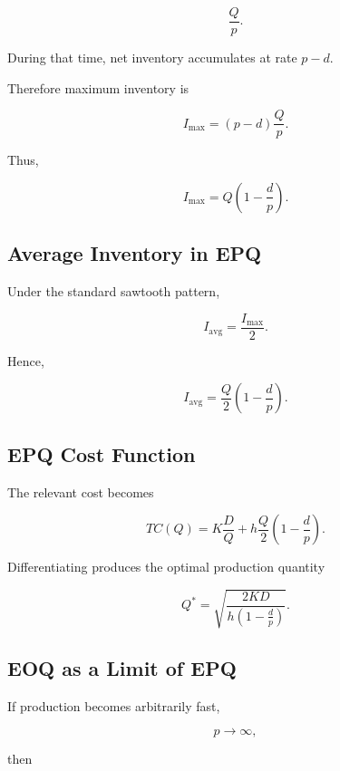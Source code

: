 \[
\boxed{
\frac{Q}{p}.
}
\]

During that time, net inventory accumulates at rate \(p-d\).

Therefore maximum inventory is

\[
\boxed{
I_{\max}
=
\left(
p-d
\right)
\frac{Q}{p}.
}
\]

Thus,

\[
\boxed{
I_{\max}
=
Q
\left(
1-\frac{d}{p}
\right).
}
\]

\subsection{Average Inventory in EPQ}
\label{subsec:epq-average-inventory}

Under the standard sawtooth pattern,

\[
\boxed{
I_{\mathrm{avg}}
=
\frac{
I_{\max}
}{
2
}.
}
\]

Hence,

\[
\boxed{
I_{\mathrm{avg}}
=
\frac{Q}{2}
\left(
1-\frac{d}{p}
\right).
}
\]

\subsection{EPQ Cost Function}
\label{subsec:epq-cost-function}

The relevant cost becomes

\[
\boxed{
TC(Q)
=
K\frac{D}{Q}
+
h
\frac{Q}{2}
\left(
1-\frac{d}{p}
\right).
}
\]

Differentiating produces the optimal production quantity

\[
\boxed{
Q^*
=
\sqrt{
\frac{
2KD
}{
h
\left(
1-\frac{d}{p}
\right)
}
}.
}
\]

\subsection{EOQ as a Limit of EPQ}
\label{subsec:eoq-limit-epq}

If production becomes arbitrarily fast,

\[
p\to\infty,
\]

then

